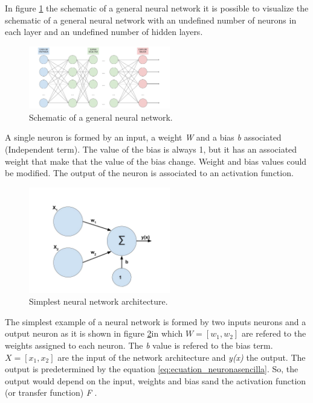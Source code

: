 In figure \ref{fig:esquemaneuronal} the schematic of a general neural network it is possible to visualize the schematic of a general neural network with an undefined number of neurons in each layer and an undefined number of hidden layers.\\

\begin{figure}[htb]
\centering
\includegraphics[width=0.55\textwidth]{images_miscelaneus/red_neuronal.jpg}
\caption{Schematic of a general neural network.} \label{fig:esquemaneuronal}
\end{figure}

A single neuron is formed by an input, a weight \textit{W} and a bias \textit{b} associated (Independent term). The value of the bias is always 1, but it has an associated weight that make that the value of the bias change. Weight and bias values could be modified. The output of the neuron is associated to an activation function. \\

\begin{figure}[htb]
\centering
\includegraphics[width=0.55\textwidth]{images_miscelaneus/neurona_sencilla.jpg}
\caption{Simplest neural network architecture.} \label{fig:neuronasencilla}
\end{figure}

The simplest example of a neural network is formed by two inputs neurons and a output neuron as it is shown in figure \ref{fig:neuronasencilla}in which \textit{$W=[w_1,w_2]$} are refered to the weights assigned to each neuron. The \textit{b} value is refered to the bias term. \textit{$X=[x_{1},x_{2}]$} are the input of the network architecture and \textit{y(x)} the output. The output is predetermined by the equation \ref{eq:ecuation_neuronasencilla}. So, the output would depend on the input, weights and bias sand the activation function (or transfer function) \textit{F} \cite{krose}. \\

